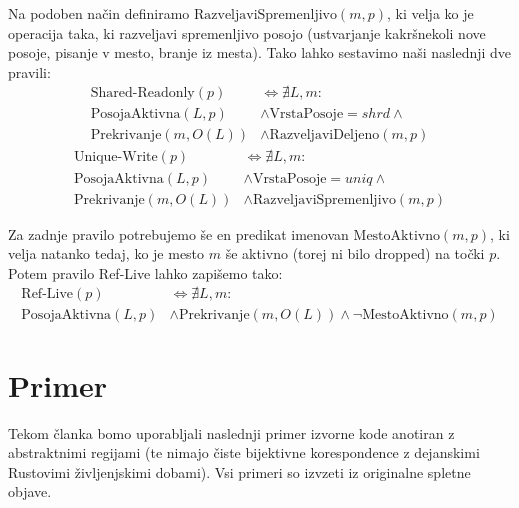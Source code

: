 \documentclass[a4paper,12pt,openright]{book}
\begin{document}
Na podoben način definiramo $\text{RazveljaviSpremenljivo}(m,p)$, ki velja ko je operacija taka, ki razveljavi
spremenljivo posojo (ustvarjanje kakršnekoli nove posoje, pisanje v mesto, branje iz mesta).
Tako lahko sestavimo naši naslednji dve pravili:
\begin{equation}
	\begin{aligned}
		\text{Shared-Readonly}(p)   & \iff  \nexists L,m:
		\\ \text{PosojaAktivna}(L,p) &\land \text{VrstaPosoje} = shrd \land \\
		\text{Prekrivanje}(m, O(L)) & \land \text{RazveljaviDeljeno}(m,p)
	\end{aligned}
\end{equation}
\begin{equation}
	\begin{aligned}
		\text{Unique-Write}(p)      & \iff  \nexists L,m:
		\\ \text{PosojaAktivna}(L,p) &\land \text{VrstaPosoje} = uniq \land \\
		\text{Prekrivanje}(m, O(L)) & \land \text{RazveljaviSpremenljivo}(m,p)
	\end{aligned}
\end{equation}

Za zadnje pravilo potrebujemo še en predikat imenovan $\text{MestoAktivno}(m,p)$, ki velja natanko tedaj,
ko je mesto $m$ še aktivno (torej ni bilo dropped) na točki $p$. Potem pravilo Ref-Live lahko zapišemo tako:
\begin{equation}
	\begin{aligned}
		\text{Ref-Live}(p) & \iff \nexists L, m: \\ \text{PosojaAktivna}(L,p) &\land \text{Prekrivanje}(m, O(L)) \land
		\neg \text{MestoAktivno}(m,p)
	\end{aligned}
\end{equation}


\section{Primer}
Tekom članka bomo uporabljali naslednji primer izvorne kode anotiran z abstraktnimi regijami (te nimajo čiste bijektivne korespondence z
dejanskimi Rustovimi življenjskimi dobami). Vsi primeri so izvzeti iz originalne spletne objave.
\end{document}
